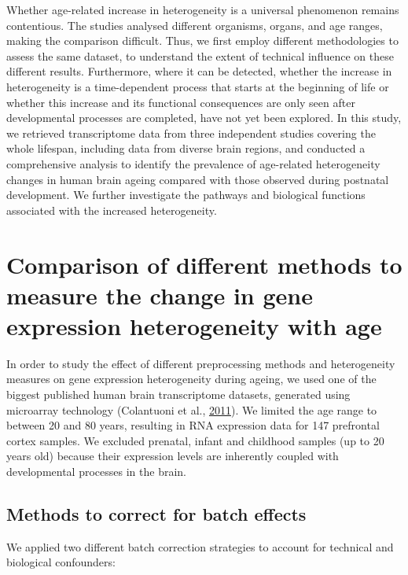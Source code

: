 \documentclass[12pt,twoside]{unicam}
\begin{document}
Whether age-related increase in heterogeneity is a universal phenomenon remains contentious. The studies analysed different organisms, organs, and age ranges, making the comparison difficult. Thus, we first employ different methodologies to assess the same dataset, to understand the extent of technical influence on these different results. Furthermore, where it can be detected, whether the increase in heterogeneity is a time-dependent process that starts at the beginning of life or whether this increase and its functional consequences are only seen after developmental processes are completed, have not yet been explored. In this study, we retrieved transcriptome data from three independent studies covering the whole lifespan, including data from diverse brain regions, and conducted a comprehensive analysis to identify the prevalence of age-related heterogeneity changes in human brain ageing compared with those observed during postnatal development. We further investigate the pathways and biological functions associated with the increased heterogeneity.

\hypertarget{veronikaresults}{%
\section{Comparison of different methods to measure the change in gene expression heterogeneity with age}\label{veronikaresults}}

In order to study the effect of different preprocessing methods and heterogeneity measures on gene expression heterogeneity during ageing, we used one of the biggest published human brain transcriptome datasets, generated using microarray technology (Colantuoni et al., \protect\hyperlink{ref-Colantuoni2011}{2011}). We limited the age range to between 20 and 80 years, resulting in RNA expression data for 147 prefrontal cortex samples. We excluded prenatal, infant and childhood samples (up to 20 years old) because their expression levels are inherently coupled with developmental processes in the brain.

\hypertarget{methods-to-correct-for-batch-effects}{%
\subsection{Methods to correct for batch effects}\label{methods-to-correct-for-batch-effects}}

We applied two different batch correction strategies to account for technical and biological confounders:
\end{document}
